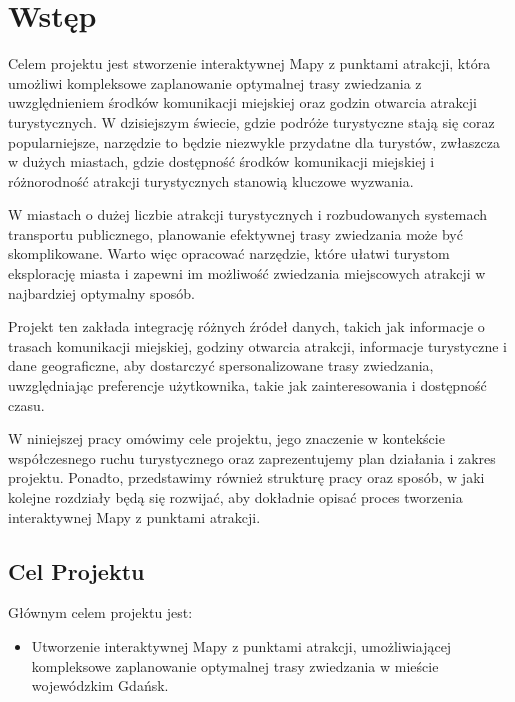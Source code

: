 \documentclass{report}
\begin{document}
	
	
	\clearpage
		\chapter{Wstęp}
	
	Celem projektu jest stworzenie interaktywnej Mapy z punktami atrakcji, która umożliwi kompleksowe zaplanowanie optymalnej trasy zwiedzania z uwzględnieniem środków komunikacji miejskiej oraz godzin otwarcia atrakcji turystycznych. W dzisiejszym świecie, gdzie podróże turystyczne stają się coraz popularniejsze, narzędzie to będzie niezwykle przydatne dla turystów, zwłaszcza w dużych miastach, gdzie dostępność środków komunikacji miejskiej i różnorodność atrakcji turystycznych stanowią kluczowe wyzwania.
	
	W miastach o dużej liczbie atrakcji turystycznych i rozbudowanych systemach transportu publicznego, planowanie efektywnej trasy zwiedzania może być skomplikowane. Warto więc opracować narzędzie, które ułatwi turystom eksplorację miasta i zapewni im możliwość zwiedzania miejscowych atrakcji w najbardziej optymalny sposób.
	
	Projekt ten zakłada integrację różnych źródeł danych, takich jak informacje o trasach komunikacji miejskiej, godziny otwarcia atrakcji, informacje turystyczne i dane geograficzne, aby dostarczyć spersonalizowane trasy zwiedzania, uwzględniając preferencje użytkownika, takie jak zainteresowania i dostępność czasu.
	
	W niniejszej pracy omówimy cele projektu, jego znaczenie w kontekście współczesnego ruchu turystycznego oraz zaprezentujemy plan działania i zakres projektu. Ponadto, przedstawimy również strukturę pracy oraz sposób, w jaki kolejne rozdziały będą się rozwijać, aby dokładnie opisać proces tworzenia interaktywnej Mapy z punktami atrakcji.
	
	\section{Cel Projektu}
	
	Głównym celem projektu jest:
	
	\begin{itemize}
		\item Utworzenie interaktywnej Mapy z punktami atrakcji, umożliwiającej kompleksowe zaplanowanie optymalnej trasy zwiedzania w mieście wojewódzkim Gdańsk.
	\end{itemize}
	
\end{document}
